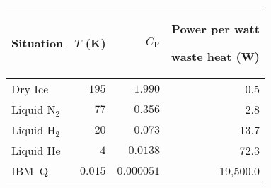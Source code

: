 \documentclass[10pt]{article}
\begin{document}
\thispagestyle{empty}
\setlength\dashlinedash{1pt}
\setlength\dashlinegap{2pt}
\newcommand{\CPf}{C_\mathrm{P}}

\renewcommand*{\arraystretch}{1.2}\small
\begin{tabular}{lrrr}\toprule
Situation
	& $T$ (K)
		& $\CPf$ & \parbox[b]{.75in}{\raggedleft Power per watt\par waste heat (W)} \\
\midrule
Dry Ice
	& $195$
		& $1.990$
			& 0.5 \\ \hdashline
Liquid N$_2$
	& $77$
		& $0.356$
			& 2.8 \\ \hdashline
Liquid H$_2$
	& $20$
		& $0.073$
			& 13.7 \\ \hdashline
Liquid He
	& $4$
		& $0.0138$
			& 72.3 \\ \hdashline
IBM~Q	& $0.015$
		& $0.000051$
			& 19,500.0 \\
\bottomrule
\end{tabular}
\end{document}
